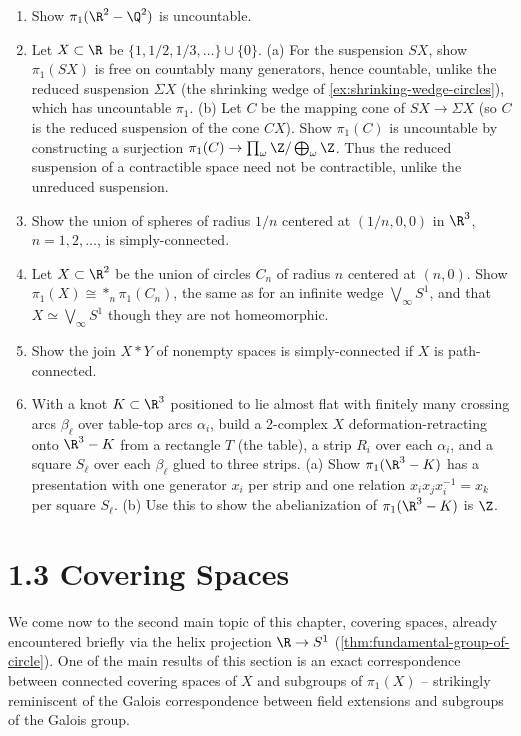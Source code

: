 \begin{enumerate}
\item Show $\pi_1(\R^2-\Q^2)$ is uncountable.

\item Let $X\subset\R$ be $\{1,1/2,1/3,\ldots\}\cup\{0\}$. (a) For the suspension $SX$,
show $\pi_1(SX)$ is free on countably many generators, hence countable, unlike the
reduced suspension $\Sigma X$ (the shrinking wedge of \cref{ex:shrinking-wedge-circles}),
which has uncountable $\pi_1$. (b) Let $C$ be the mapping cone of $SX\to\Sigma X$
(so $C$ is the reduced suspension of the cone $CX$). Show $\pi_1(C)$ is uncountable
by constructing a surjection $\pi_1(C) \to \prod_\omega\Z/\bigoplus_\omega\Z$. Thus the
reduced suspension of a contractible space need not be contractible, unlike the
unreduced suspension.

\item Show the union of spheres of radius $1/n$ centered at $(1/n,0,0)$ in $\R^3$,
$n=1,2,\ldots$, is simply-connected.

\item Let $X\subset\R^2$ be the union of circles $C_n$ of radius $n$ centered at
$(n,0)$. Show $\pi_1(X) \cong *_n\pi_1(C_n)$, the same as for an infinite wedge
$\bigvee_\infty S^1$, and that $X \simeq \bigvee_\infty S^1$ though they are not
homeomorphic.

\item Show the join $X*Y$ of nonempty spaces is simply-connected if $X$ is
path-connected.

\item [\textbf{Wirtinger presentation.}] With a knot $K\subset\R^3$ positioned to lie
almost flat with finitely many crossing arcs $\beta_\ell$ over table-top arcs $\alpha_i$, build
a 2-complex $X$ deformation-retracting onto $\R^3-K$ from a rectangle $T$ (the
table), a strip $R_i$ over each $\alpha_i$, and a square $S_\ell$ over each $\beta_\ell$ glued to three
strips. (a) Show $\pi_1(\R^3-K)$ has a presentation with one generator $x_i$ per strip
and one relation $x_ix_jx_i^{-1}=x_k$ per square $S_\ell$. (b) Use this to show the
abelianization of $\pi_1(\R^3-K)$ is $\Z$.
\end{enumerate}

\section{1.3 Covering Spaces}
\label{sec:covering-spaces}

We come now to the second main topic of this chapter, covering spaces, already
encountered briefly via the helix projection $\R \to S^1$
(\cref{thm:fundamental-group-of-circle}). One of the main results of this section is an exact
correspondence between connected covering spaces of $X$ and subgroups of
$\pi_1(X)$ -- strikingly reminiscent of the Galois correspondence between field
extensions and subgroups of the Galois group.


